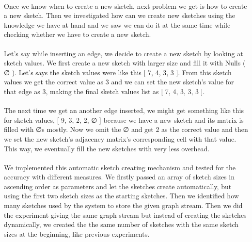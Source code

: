 \documentclass[12pt]{report}
\numberwithin{figure}{section}
\numberwithin{table}{section}
\begin{document}
\paragraph{}

Once we know when to create a new sketch, next problem we get is how to create a new sketch. Then we investigated how can we create new sketches using the knowledge we have at hand and we saw we can do it at the same time while checking whether we have to create a new sketch.

\paragraph{}

Let’s say while inserting an edge,  we decide to create a new sketch by looking at sketch values. We first create a new sketch with larger size and fill it with Nulls ( ∅ ). Let’s says  the sketch values were like this [ 7, 4, 3, 3 ]. From this sketch values we get the correct value as 3 and we can set the new sketch's value for that edge as 3, making the final sketch values list as  [ 7, 4, 3, 3, 3 ]. 

\paragraph{}

The next time we get an another edge inserted, we might get something like this for sketch values, [ 9, 3, 2, 2, ∅ ] because we have a new sketch and its matrix is filled with ∅s mostly. Now we omit the ∅ and get 2 as the correct value and then we set the new sketch’s adjacency matrix’s corresponding cell with that value. This way, we eventually fill the new sketches with very less overhead.  

\paragraph{}

We implemented this automatic sketch creating mechanism and tested for the accuracy with different measures. We firstly passed an array of sketch sizes in ascending order as parameters and let the sketches create automatically, but using the first two sketch sizes as the starting sketches. Then we identified how many sketches used by the system to store the given graph stream. Then we did the experiment giving the same graph stream but instead of creating the sketches dynamically, we created the the same number of sketches with the same sketch sizes at the beginning, like previous experiments.
\end{document}
